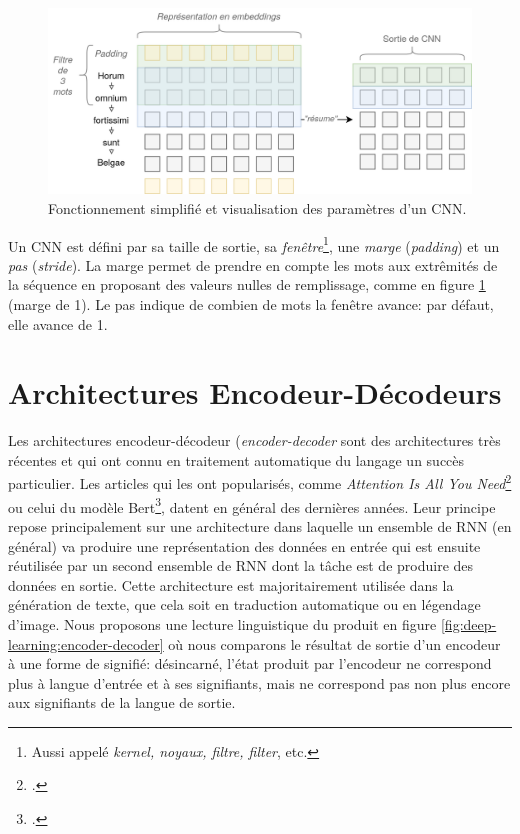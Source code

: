 \begin{figure}[h]
    \centering
    \includegraphics[width=\linewidth]{results/deep-learning/explanations/CNN.png}
    \caption{Fonctionnement simplifié et visualisation des paramètres d'un CNN.}
    \label{fig:deep-learning:cnn-tal}
\end{figure}

Un CNN est défini par sa taille de sortie, sa \textit{fenêtre}\footnote{Aussi appelé \textit{kernel, noyaux, filtre, filter}, etc.}, une \textit{marge} (\textit{padding}) et un \textit{pas} (\textit{stride}). La marge permet de prendre en compte les mots aux extrêmités de la séquence en proposant des valeurs nulles de remplissage, comme en figure \ref{fig:deep-learning:cnn-tal} (marge de 1). Le pas indique de combien de mots la fenêtre avance: par défaut, elle avance de 1. 

\section{Architectures Encodeur-Décodeurs}
\label{deep-learning:encoder-decoder}

Les architectures encodeur-décodeur (\textit{encoder-decoder} sont des architectures très récentes et qui ont connu en traitement automatique du langage un succès particulier. Les articles qui les ont popularisés, comme \textit{Attention Is All You Need}\footcite{vaswani_attention_2017} ou celui du modèle Bert\footcite{devlin_bert_2019}, datent en général des dernières années. Leur principe repose principalement sur une architecture dans laquelle un ensemble de RNN (en général) va produire une représentation des données en entrée qui est ensuite réutilisée par un second ensemble de RNN dont la tâche est de produire des données en sortie. Cette architecture est majoritairement utilisée dans la génération de texte, que cela soit en traduction automatique ou en légendage d'image. Nous proposons une lecture linguistique du produit en figure \ref{fig:deep-learning:encoder-decoder} où nous comparons le résultat de sortie d'un encodeur à une forme de signifié: désincarné, l'état produit par l'encodeur ne correspond plus à langue d'entrée et à ses signifiants, mais ne correspond pas non plus encore aux signifiants de la langue de sortie.

